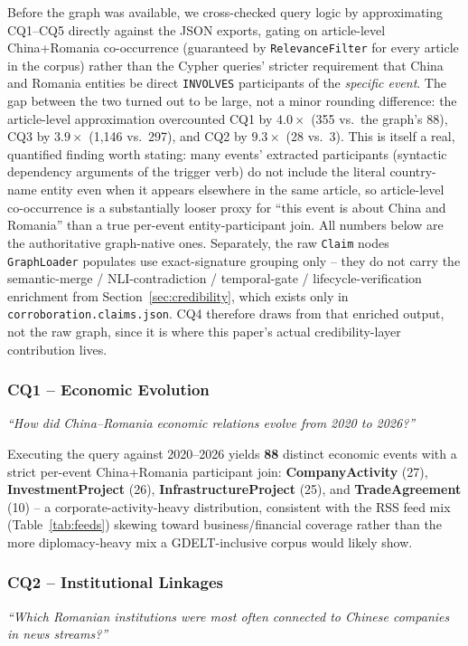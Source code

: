 \documentclass[conference]{IEEEtran}
\begin{document}
Before the graph was available, we cross-checked query logic by
approximating CQ1--CQ5 directly against the JSON exports, gating on
article-level China+Romania co-occurrence (guaranteed by
\texttt{RelevanceFilter} for every article in the corpus) rather than the
Cypher queries' stricter requirement that China and Romania entities be
direct \texttt{INVOLVES} participants of the \emph{specific event}. The gap
between the two turned out to be large, not a minor rounding difference:
the article-level approximation overcounted CQ1 by $4.0\times$ (355 vs.\
the graph's 88), CQ3 by $3.9\times$ (1{,}146 vs.\ 297), and CQ2 by
$9.3\times$ (28 vs.\ 3). This is itself a real, quantified finding worth
stating: many events' extracted participants (syntactic dependency
arguments of the trigger verb) do not include the literal country-name
entity even when it appears elsewhere in the same article, so
article-level co-occurrence is a substantially looser proxy for
``this event is about China and Romania'' than a true per-event
entity-participant join. All numbers below are the authoritative
graph-native ones. Separately, the raw \texttt{Claim} nodes
\texttt{GraphLoader} populates use exact-signature grouping only -- they do
not carry the semantic-merge / NLI-contradiction / temporal-gate /
lifecycle-verification enrichment from Section~\ref{sec:credibility},
which exists only in \texttt{corroboration.claims.json}. CQ4 therefore
draws from that enriched output, not the raw graph, since it is where this
paper's actual credibility-layer contribution lives.

\subsubsection{CQ1 -- Economic Evolution}
\textit{``How did China--Romania economic relations evolve from 2020 to 2026?''}

Executing the query against 2020--2026 yields \textbf{88} distinct economic
events with a strict per-event China+Romania participant join:
\textbf{CompanyActivity} (27), \textbf{InvestmentProject} (26),
\textbf{InfrastructureProject} (25), and \textbf{TradeAgreement} (10) -- a
corporate-activity-heavy distribution, consistent with the RSS feed mix
(Table~\ref{tab:feeds}) skewing toward business/financial coverage rather
than the more diplomacy-heavy mix a GDELT-inclusive corpus would likely
show.

\subsubsection{CQ2 -- Institutional Linkages}
\textit{``Which Romanian institutions were most often connected to Chinese companies in news streams?''}
\end{document}
